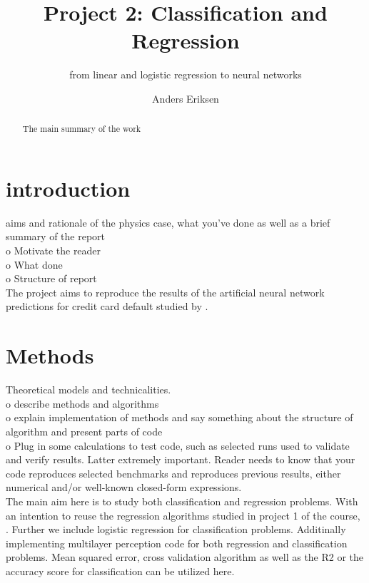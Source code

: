 \documentclass[12pt, a4paper]{scrartcl}
\title{Project 2: Classification and Regression}
\subtitle{from linear and logistic regression to neural networks}
\author{Anders Eriksen}
\date{}
\begin{document}
\maketitle
\tableofcontents
\begin{abstract}
    The main summary of the work
\end{abstract}

\section{introduction}
    aims and rationale of the physics case, what you've done as well as a brief summary of 
the report \\
    o   Motivate the reader\\
    o   What done\\
    o   Structure of report\\

    The project aims to reproduce the results of the artificial neural network predictions 
for credit card default studied by \cite{creditcardarticle}.

\section{Methods}
    Theoretical models and technicalities. \\
    o   describe methods and algorithms\\
    o   explain implementation of methods and say something about the structure of
        algorithm and present parts of code\\
    o   Plug in some calculations to test code, such as selected runs used to validate and
        verify results. Latter extremely important. Reader needs to know that your code
        reproduces selected benchmarks and reproduces previous results, either numerical 
        and/or well-known closed-form expressions. \\

   The main aim here is to study both classification and regression problems. With an intention 
to reuse the regression algorithms studied in project 1 of the course, \cite{project1}. Further 
we include logistic regression for classification problems. Additinally implementing multilayer 
perception code for both regression and classification problems. Mean squared error, cross 
validation algorithm as well as the R2 or the accuracy score for classification can be utilized 
here. \\
\end{document}
